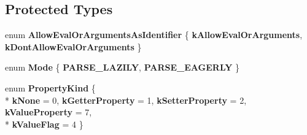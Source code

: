 \subsection*{Protected Types}
\begin{DoxyCompactItemize}
\item 
\hypertarget{classv8_1_1internal_1_1_parser_base_affc7756a813647a58cdccf9026d752c6}{}enum {\bfseries Allow\+Eval\+Or\+Arguments\+As\+Identifier} \{ {\bfseries k\+Allow\+Eval\+Or\+Arguments}, 
{\bfseries k\+Dont\+Allow\+Eval\+Or\+Arguments}
 \}\label{classv8_1_1internal_1_1_parser_base_affc7756a813647a58cdccf9026d752c6}

\item 
\hypertarget{classv8_1_1internal_1_1_parser_base_ab90834d36492d39261738be7849e2d47}{}enum {\bfseries Mode} \{ {\bfseries P\+A\+R\+S\+E\+\_\+\+L\+A\+Z\+I\+L\+Y}, 
{\bfseries P\+A\+R\+S\+E\+\_\+\+E\+A\+G\+E\+R\+L\+Y}
 \}\label{classv8_1_1internal_1_1_parser_base_ab90834d36492d39261738be7849e2d47}

\item 
\hypertarget{classv8_1_1internal_1_1_parser_base_ac80708c3ae7276debfea0504986c257f}{}enum {\bfseries Property\+Kind} \{ \\*
{\bfseries k\+None} = 0, 
{\bfseries k\+Getter\+Property} = 1, 
{\bfseries k\+Setter\+Property} = 2, 
{\bfseries k\+Value\+Property} = 7, 
\\*
{\bfseries k\+Value\+Flag} = 4
 \}\label{classv8_1_1internal_1_1_parser_base_ac80708c3ae7276debfea0504986c257f}

\end{DoxyCompactItemize}

